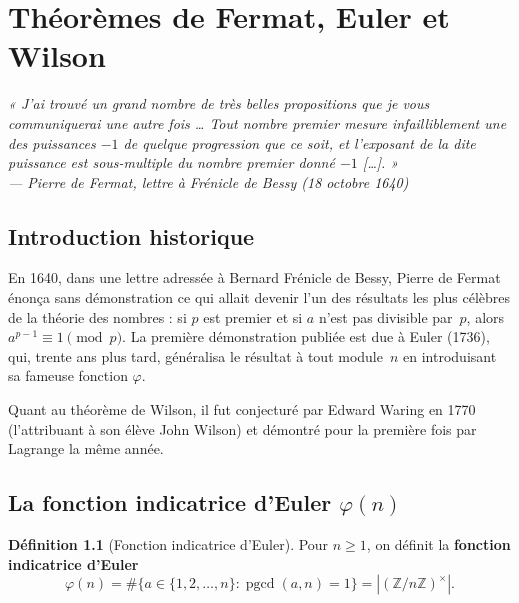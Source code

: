 \documentclass[12pt,a4paper,openany]{book}
\theoremstyle{definition}
\newtheorem{definition}{Définition}[chapter]
\theoremstyle{plain}
\theoremstyle{remark}
\newcommand{\Z}{\mathbb{Z}}
\newcommand{\abs}[1]{\left|#1\right|}
\DeclareMathOperator{\pgcd}{pgcd}
\begin{document}
\chapter{Théorèmes de Fermat, Euler et Wilson}
\label{ch:fermat-euler-wilson}

\vspace{-0.5em}
\begin{center}\itshape
  « J'ai trouvé un grand nombre de très belles propositions que je vous
  communiquerai une autre fois \ldots{} Tout nombre premier mesure
  infailliblement une des puissances $-1$ de quelque progression que ce soit,
  et l'exposant de la dite puissance est sous-multiple du nombre premier
  donné $-1$ [\ldots]. »\\[2pt]
  --- Pierre de Fermat, lettre à Frénicle de Bessy (18 octobre 1640)
\end{center}
\bigskip

\section{Introduction historique}
\label{sec:few-hist}

En 1640, dans une lettre adressée à Bernard Frénicle de Bessy,
Pierre de Fermat énonça sans démonstration ce qui allait
devenir l'un des résultats les plus célèbres de la théorie des nombres : si $p$
est premier et si $a$ n'est pas divisible par~$p$, alors $a^{p-1} \equiv 1 \pmod{p}$.
La première démonstration publiée est due à Euler (1736),
qui, trente ans plus tard, généralisa le résultat à tout module~$n$ en introduisant
sa fameuse fonction $\varphi$.

Quant au théorème de Wilson, il fut conjecturé par Edward Waring
en 1770 (l'attribuant à son élève John Wilson) et démontré pour
la première fois par Lagrange la même année.

\section{La fonction indicatrice d'Euler $\varphi(n)$}
\label{sec:euler-phi}

\begin{definition}[Fonction indicatrice d'Euler]
\label{def:euler-phi}
Pour $n \geqslant 1$, on définit la \textbf{fonction indicatrice d'Euler}
\[
  \varphi(n) = \#\{ a \in \{1, 2, \ldots, n\} : \pgcd(a, n) = 1 \}
  = \abs{(\Z/n\Z)^\times}.
\]
\end{definition}
\end{document}
